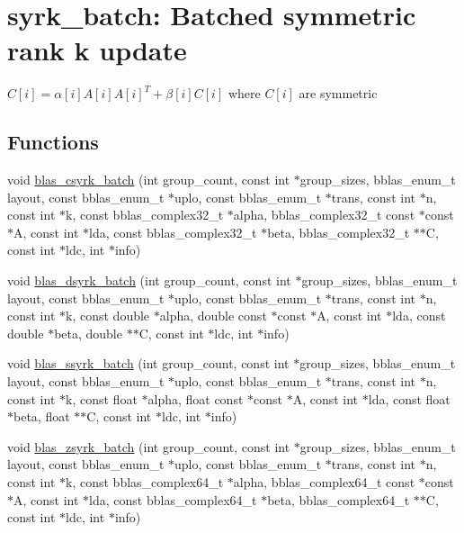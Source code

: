 \hypertarget{group__syrk__batch}{}\section{syrk\+\_\+batch\+: Batched symmetric rank k update}
\label{group__syrk__batch}


$ C[i] = \alpha[i] A[i] A[i]^T + \beta[i] C[i] $ where $ C[i] $ are symmetric  


\subsection*{Functions}
\begin{DoxyCompactItemize}
\item 
void \mbox{\hyperlink{group__syrk__batch_ga94e86ba1afc5a916a21c81c36b69d7b8}{blas\+\_\+csyrk\+\_\+batch}} (int group\+\_\+count, const int $\ast$group\+\_\+sizes, bblas\+\_\+enum\+\_\+t layout, const bblas\+\_\+enum\+\_\+t $\ast$uplo, const bblas\+\_\+enum\+\_\+t $\ast$trans, const int $\ast$n, const int $\ast$k, const bblas\+\_\+complex32\+\_\+t $\ast$alpha, bblas\+\_\+complex32\+\_\+t const $\ast$const $\ast$A, const int $\ast$lda, const bblas\+\_\+complex32\+\_\+t $\ast$beta, bblas\+\_\+complex32\+\_\+t $\ast$$\ast$C, const int $\ast$ldc, int $\ast$info)
\item 
void \mbox{\hyperlink{group__syrk__batch_gad68fb19e3fc8cc2d118be659cecae1a5}{blas\+\_\+dsyrk\+\_\+batch}} (int group\+\_\+count, const int $\ast$group\+\_\+sizes, bblas\+\_\+enum\+\_\+t layout, const bblas\+\_\+enum\+\_\+t $\ast$uplo, const bblas\+\_\+enum\+\_\+t $\ast$trans, const int $\ast$n, const int $\ast$k, const double $\ast$alpha, double const $\ast$const $\ast$A, const int $\ast$lda, const double $\ast$beta, double $\ast$$\ast$C, const int $\ast$ldc, int $\ast$info)
\item 
void \mbox{\hyperlink{group__syrk__batch_ga67e4827aa5b548bf5d43cc254c363819}{blas\+\_\+ssyrk\+\_\+batch}} (int group\+\_\+count, const int $\ast$group\+\_\+sizes, bblas\+\_\+enum\+\_\+t layout, const bblas\+\_\+enum\+\_\+t $\ast$uplo, const bblas\+\_\+enum\+\_\+t $\ast$trans, const int $\ast$n, const int $\ast$k, const float $\ast$alpha, float const $\ast$const $\ast$A, const int $\ast$lda, const float $\ast$beta, float $\ast$$\ast$C, const int $\ast$ldc, int $\ast$info)
\item 
void \mbox{\hyperlink{group__syrk__batch_gab46bf316b01f4a7d1c8eeedcaed8a65e}{blas\+\_\+zsyrk\+\_\+batch}} (int group\+\_\+count, const int $\ast$group\+\_\+sizes, bblas\+\_\+enum\+\_\+t layout, const bblas\+\_\+enum\+\_\+t $\ast$uplo, const bblas\+\_\+enum\+\_\+t $\ast$trans, const int $\ast$n, const int $\ast$k, const bblas\+\_\+complex64\+\_\+t $\ast$alpha, bblas\+\_\+complex64\+\_\+t const $\ast$const $\ast$A, const int $\ast$lda, const bblas\+\_\+complex64\+\_\+t $\ast$beta, bblas\+\_\+complex64\+\_\+t $\ast$$\ast$C, const int $\ast$ldc, int $\ast$info)
\end{DoxyCompactItemize}



